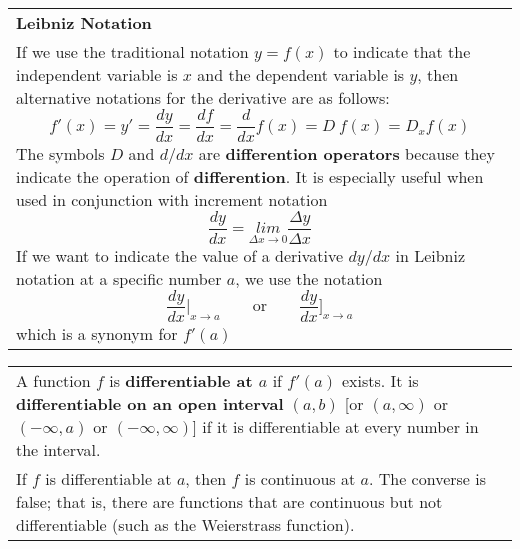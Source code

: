 \documentclass[fleqn]{article}
\begin{document}
\begin{center}
\def\arraystretch{1.3}
{\setlength{\tabcolsep}{16pt}
\begin{tabularx}{.9\textwidth}{|X|}
\hline
	\vspace{1pt}
	\textbf{Leibniz Notation} \\
	If we use the traditional notation $y=f(x)$ to indicate that the independent variable is $x$ and the dependent variable is $y$, then alternative notations for the derivative are as follows:
	$$f'(x) = y' = \dfrac{dy}{dx} = \dfrac{df}{dx} = \dfrac{d}{dx} f(x) = D \: f(x) = D_x f(x)$$
	The symbols $D$ and $d/dx$ are \textbf{differention operators} because they indicate the operation of \textbf{differention}. It is especially useful when used in conjunction with increment notation
	$$\dfrac{dy}{dx} = \underset{\Delta x \to 0}{lim} \dfrac{\Delta y}{\Delta x}$$
	If we want to indicate the value of a derivative $dy/dx$ in Leibniz notation at a specific number $a$, we use the notation
	$$\dfrac{dy}{dx} \Big|_{x \to a} \hspace{24pt} \text{or} \hspace{24pt} \dfrac{dy}{dx} \Big]_{x \to a}$$
	which is a synonym for $f'(a)$
	\\[16pt]
	\hline
\end{tabularx}}
\vspace{12pt}

\def\arraystretch{1.3}
{\setlength{\tabcolsep}{16pt}
\begin{tabularx}{.9\textwidth}{|X|}
\hline
	\vspace{1pt}
	A function $f$ is \textbf{differentiable at $a$} if $f'(a)$ exists. It is \textbf{differentiable on an open interval} $(a, b)$ [or $(a, \infty)$ or $(-\infty, a)$ or $(-\infty, \infty)$] if it is differentiable at every number in the interval. \\[5pt]
	If $f$ is differentiable at $a$, then $f$ is continuous at $a$.  The converse is false; that is, there are functions that are continuous but not differentiable (such as the Weierstrass function).
	\\[16pt]
	\hline
\end{tabularx}}
\vspace{12pt}


\end{center}
\end{document}
